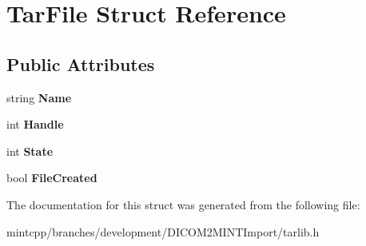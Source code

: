 \hypertarget{struct_tar_file}{
\section{TarFile Struct Reference}
\label{struct_tar_file}
}
\subsection*{Public Attributes}
\begin{DoxyCompactItemize}
\item 
\hypertarget{struct_tar_file_a7e31fea777f091e639afd6e575eea09a}{
string {\bfseries Name}}
\label{struct_tar_file_a7e31fea777f091e639afd6e575eea09a}

\item 
\hypertarget{struct_tar_file_a366778553321b36a7d339410e7a14f6e}{
int {\bfseries Handle}}
\label{struct_tar_file_a366778553321b36a7d339410e7a14f6e}

\item 
\hypertarget{struct_tar_file_a6b3d50d75047d6452e4019fa603abc7f}{
int {\bfseries State}}
\label{struct_tar_file_a6b3d50d75047d6452e4019fa603abc7f}

\item 
\hypertarget{struct_tar_file_a76395a67ac18c94a8f6170dc746237d2}{
bool {\bfseries FileCreated}}
\label{struct_tar_file_a76395a67ac18c94a8f6170dc746237d2}

\end{DoxyCompactItemize}


The documentation for this struct was generated from the following file:\begin{DoxyCompactItemize}
\item 
mintcpp/branches/development/DICOM2MINTImport/tarlib.h\end{DoxyCompactItemize}
